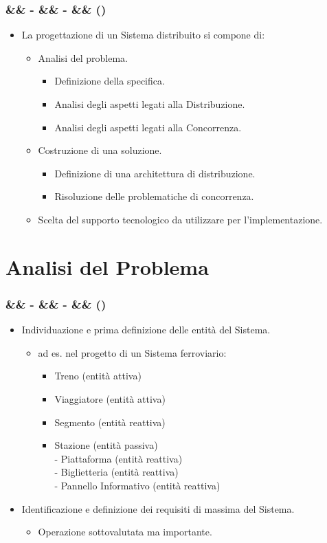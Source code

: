 \documentclass[slidestop,compress,blackandwhite]{beamer}
\newcommand{\cm}[1]{\vspace{#1cm}}
\newcommand{\newtitle}[4]{
	#1 
	\ifx&#2&%
	\else
  		\large- #2
	\fi
	\ifx&#3&%
	\else
  		\normalsize- #3
	\fi
	\ifx&#4&%
	\else
  		\normalsize (#4)
	\fi
}
\newcommand{\newframe}[5]{
	\begin{frame}
		\frametitle{\newtitle{#1}{#2}{#3}{#4}}
		#5
	\end{frame}
}
\newcommand{\myitemize}[1]{
	\begin{itemize}\itemsep4pt
	#1
	\end{itemize}
}
\begin{document}
	\newframe{}{}{}{}{
		\myitemize {
			\item La progettazione di un Sistema distribuito si compone di:
				\cm{0.3}
				\myitemize {
					\item Analisi del problema.
						\cm{0.3}
						\myitemize {
							\item Definizione della specifica.
							\item Analisi degli aspetti legati alla Distribuzione.
							\item Analisi degli aspetti legati alla Concorrenza.
						}
					\cm{0.3}
					\item Costruzione di una soluzione.
					\cm{0.3}	
						\myitemize {
							\item Definizione di una architettura di distribuzione.
							\item Risoluzione delle problematiche di concorrenza.
						}
					\cm{0.3}
					\item Scelta del supporto tecnologico da utilizzare per l'implementazione.
				}
		}
	}

\section{Analisi del Problema}\label{analisis}
	\newframe{}{}{}{}{
		\myitemize {
			\item Individuazione e prima definizione delle entità del Sistema.
				\myitemize {
					\item ad es. nel progetto di un Sistema ferroviario:
						\myitemize{
							\item Treno (entità attiva)
							\item Viaggiatore (entità attiva)
							\item Segmento (entità reattiva)
							\item Stazione (entità passiva)\\\cm{0.1}
								- Piattaforma (entità reattiva)\\ \cm{0.1}
								- Biglietteria (entità reattiva)\\ \cm{0.1}
								- Pannello Informativo (entità reattiva)
							
						}
				}
			\item Identificazione e definizione dei requisiti di massima del Sistema.
				\myitemize{
					\item Operazione sottovalutata ma importante.
				}
		}
	}
	
\end{document}
